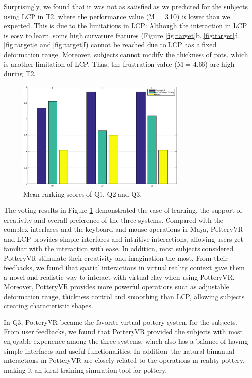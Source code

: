 \documentclass{svjour3}                     %
\begin{document}
Surprisingly, we found that it was not as satisfied as we predicted for the subjects using LCP in T2, where the performance value (M = 3.10) is lower than we expected. This is due to the limitations in LCP: Although the interaction in LCP is easy to learn, some high curvature features (Figure \ref{fig:target}b, \ref{fig:target}d, \ref{fig:target}e and \ref{fig:target}f) cannot be reached due to LCP has a fixed deformation range. Moreover, subjects cannot modify the thickness of pots, which is another limitation of LCP. Thus, the frustration value (M = 4.66) are high during T2.

\begin{figure}
	\includegraphics[width=0.75\textwidth]{ranking.eps}
	\caption{Mean ranking scores of Q1, Q2 and Q3.}
	\label{fig:ranking}
\end{figure}

The voting results in Figure \ref{fig:ranking} demonstrated the ease of learning, the support of creativity and overall preference of the three systems.
Compared with the complex interfaces and the keyboard and mouse operations in Maya, PotteryVR and LCP provides simple interfaces and intuitive interactions, allowing users get familiar with the interaction with ease.
In addition, most subjects considered PotteryVR stimulate their creativity and imagination the most. From their feedbacks, we found that spatial interactions in virtual reality context gave them a novel and realistic way to interact with virtual clay when using PotteryVR. Moreover, PotteryVR provides more powerful operations such as adjustable deformation range, thickness control and smoothing than LCP, allowing subjects creating characteristic shapes.

In Q3, PotteryVR became the favorite virtual pottery system for the subjects. From user feedbacks, we found that PotteryVR provided the subjects with most enjoyable experience among the three systems, which also has a balance of having simple interfaces and useful functionalities. In addition, the natural bimanual interactions in PotteryVR are closely related to the operations in reality pottery, making it an ideal training simulation tool for pottery.
\end{document}
